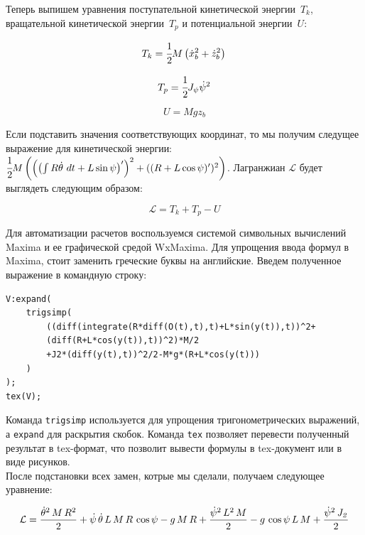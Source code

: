\documentclass[12pt,a4paper,openany]{extarticle}
\begin{document}
Теперь выпишем уравнения поступательной кинетической энергии~$T_k$, вращательной кинетической энергии~$T_p$ и потенциальной энергии~$U$:

\begin{equation}
T_k=\cfrac12 M\left(\dot{x}_b^2+\dot{z}_b^2\right)\\
\end{equation}

\begin{equation}
T_p=\cfrac12J_\psi\dot{\psi}^2
\end{equation}

\begin{equation}
U=Mgz_b
\end{equation}

Если подставить значения соответствующих координат, то мы получим следущее выражение для кинетической энергии: $\cfrac12 M\left(\left(\left(\int R\dot{\theta}\ dt+L\sin\psi\right)'\right)^2
+((R+L\cos\psi)')^2 \right)$. 
Лагранжиан $\mathcal{L}$ будет выглядеть следующим образом:

\begin{equation}
\mathcal{L}=T_k+T_p-U
\end{equation}

Для автоматизации расчетов воспользуемся системой символьных вычислений Maxima и ее графической средой WxMaxima. Для упрощения ввода формул в Maxima, стоит заменить греческие буквы на английские. Введем полученное выражение в командную строку:

\begin{lstlisting}
V:expand(
	trigsimp(
		((diff(integrate(R*diff(O(t),t),t)+L*sin(y(t)),t))^2+
		(diff(R+L*cos(y(t)),t))^2)*M/2
		+J2*(diff(y(t),t))^2/2-M*g*(R+L*cos(y(t)))
	)
);
tex(V);
\end{lstlisting}

Команда \verb|trigsimp| используется для упрощения тригонометрических выражений, а \verb|expand| для раскрытия скобок. Команда \verb|tex| позволяет перевести полученный результат в tex-формат, что позволит вывести формулы в tex-документ или в виде рисунков.\\
После подстановки всех замен, котрые мы сделали, получаем следующее уравнение:

\begin{equation}
	 \mathcal{L}={{\dot\theta^2\,M\,R^2}\over{2}}+\dot\psi\,\dot\theta\,L\,M\,R\,\cos\psi-g\,
	  M\,R+{{\dot\psi^2\,L^2\,M}\over{2}}-g\,\cos \psi\,L\,M+{{\dot\psi^2\,{\it J_2}}\over{2}}
\end{equation} 
\end{document}
